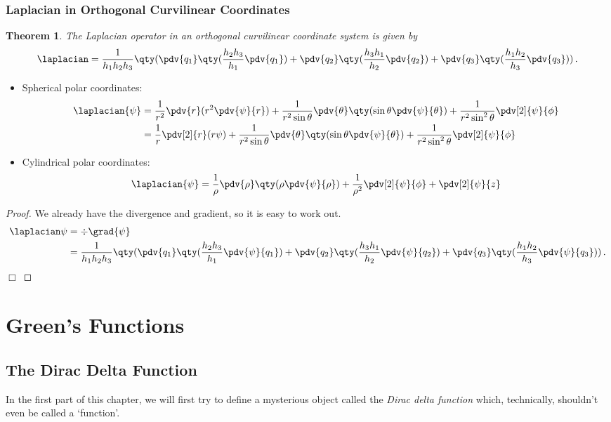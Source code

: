 \documentclass{article}
\theoremstyle{plain}\theoremheaderfont{\normalfont\itshape}\theorembodyfont{\rmfamily}\theoremseparator{.}\newtheorem*{rem}{Remark}\newtheorem*{ex}{Example}\newtheorem*{proof}{Proof}\newtheorem*{altp}{Alternative proof}
\theoremstyle{plain}\theoremheaderfont{\normalfont\bfseries}\theorembodyfont{\rmfamily}\theoremseparator{.}\newtheorem{thm}{Theorem}[section]\newtheorem{lem}[thm]{Lemma}\newtheorem{prop}[thm]{Proposition}\newtheorem*{cor}{Corollary}\newtheorem{defn}[thm]{Definition}\newtheorem{clm}[thm]{Claim}\newtheorem{clminproof}{Claim}
\theoremstyle{break}\theoremheaderfont{\normalfont\itshape}\theorembodyfont{\rmfamily}\theoremseparator{.\medskip}\newtheorem*{proofskip}{Proof}\newtheorem*{exs}{Examples}\newtheorem*{rems}{Remarks}
\theoremstyle{break}\theoremheaderfont{\normalfont\bfseries}\theorembodyfont{\rmfamily}\theoremseparator{.\medskip}\newtheorem{lemskip}[thm]{Lemma}\newtheorem{defnskip}[thm]{Definition}\newtheorem{propskip}[thm]{Proposition}\newtheorem{thmskip}[thm]{Theorem}
\numberwithin{equation}{section}
\newcommand{\qed}{\hfill\ensuremath{\Box}}
\begin{document}
	\subsubsection{Laplacian in Orthogonal Curvilinear Coordinates}
	\begin{thm}
		The Laplacian operator in an orthogonal curvilinear coordinate system is given by
		\[\laplacian=\frac{1}{h_1h_2h_3}\qty(\pdv{q_1}\qty(\frac{h_2h_3}{h_1}\pdv{q_1})+\pdv{q_2}\qty(\frac{h_3h_1}{h_2}\pdv{q_2})+\pdv{q_3}\qty(\frac{h_1h_2}{h_3}\pdv{q_3}))\,.\]
	\end{thm}
	\begin{itemize}[leftmargin=50pt]
		\item Spherical polar coordinates:
		\begin{align*}
			\laplacian{\psi}&=\frac{1}{r^2}\pdv{r}(r^2\pdv{\psi}{r})+\frac{1}{r^2\sin\theta}\pdv{\theta}\qty(\sin\theta\pdv{\psi}{\theta})+\frac{1}{r^2\sin^2\theta}\pdv[2]{\psi}{\phi}\\
			&=\frac{1}{r}\pdv[2]{r}(r\psi)+\frac{1}{r^2\sin\theta}\pdv{\theta}\qty(\sin\theta\pdv{\psi}{\theta})+\frac{1}{r^2\sin^2\theta}\pdv[2]{\psi}{\phi}
		\end{align*}
		\item Cylindrical polar coordinates:
		\[\laplacian{\psi}=\frac{1}{\rho}\pdv{\rho} \qty(\rho\pdv{\psi}{\rho})+\frac{1}{\rho^2}\pdv[2]{\psi}{\phi}+\pdv[2]{\psi}{z}\]
	\end{itemize}
	\begin{proof}
		We already have the divergence and gradient, so it is easy to work out.
		\begin{align*}
			\laplacian\psi&=\div\grad{\psi}\\
			&=\frac{1}{h_1h_2h_3}\qty(\pdv{q_1}\qty(\frac{h_2h_3}{h_1}\pdv{\psi}{q_1})+\pdv{q_2}\qty(\frac{h_3h_1}{h_2}\pdv{\psi}{q_2})+\pdv{q_3}\qty(\frac{h_1h_2}{h_3}\pdv{\psi}{q_3}))\,.
		\end{align*}\qed
	\end{proof}
	\newpage

	\section{Green's Functions}
	\subsection{The Dirac Delta Function}
	In the first part of this chapter, we will first try to define a mysterious object called the \textit{Dirac delta function} which, technically, shouldn't even be called a `function'.
\end{document}
